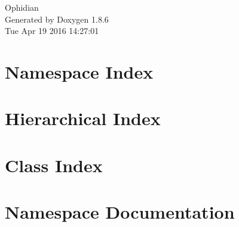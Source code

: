 \documentclass[twoside]{book}
\newcommand{\clearemptydoublepage}{%
  \newpage{\pagestyle{empty}\cleardoublepage}%
}
\begin{document}
\hypersetup{pageanchor=false}
\begin{titlepage}
\vspace*{7cm}
\begin{center}%
{\Large Ophidian }\\
\vspace*{1cm}
{\large Generated by Doxygen 1.8.6}\\
\vspace*{0.5cm}
{\small Tue Apr 19 2016 14:27:01}\\
\end{center}
\end{titlepage}
\clearemptydoublepage
\tableofcontents
\clearemptydoublepage
{}
\hypersetup{pageanchor=true}

\chapter{Namespace Index}

\chapter{Hierarchical Index}

\chapter{Class Index}

\chapter{Namespace Documentation}







\end{document}
